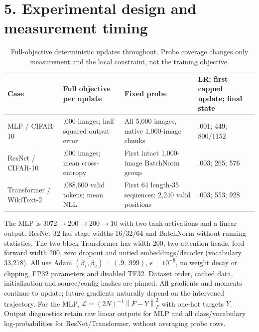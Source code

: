 \documentclass[11pt,a4paper]{article}
\newcommand{\norm}[1]{\left\lVert#1\right\rVert}
\newcommand{\sect}[1]{\vspace{2pt}\section*{#1}\vspace{-4pt}}
\begin{document}
\newpage
\sect{5. Experimental design and measurement timing}
\begin{table}[H]
\centering\small\setlength{\tabcolsep}{4pt}
\begin{tabular}{@{}>{\raggedright\arraybackslash}p{.17\linewidth}>{\raggedright\arraybackslash}p{.27\linewidth}>{\raggedright\arraybackslash}p{.29\linewidth}>{\raggedright\arraybackslash}p{.20\linewidth}@{}}
\toprule
Case & Full objective per update & Fixed probe & LR; first capped update; final state \\
\midrule
MLP / CIFAR-10 & 5,000 images; half squared output error & All 5,000 images, native 1,000-image chunks & .001; 449; 800/1152 \\
ResNet / CIFAR-10 & 50,000 images; mean cross-entropy & First intact 1,000-image BatchNorm group & .003; 265; 576 \\
Transformer / WikiText-2 & 2,088,600 valid tokens; mean NLL & First 64 length-35 sequences: 2,240 valid positions & .003; 553; 928 \\
\bottomrule
\end{tabular}
\caption{Full-objective deterministic updates throughout. Probe coverage changes only
measurement and the local constraint, not the training objective.}
\end{table}

The MLP is $3072\to200\to200\to10$ with two tanh activations and a linear output.
ResNet-32 has stage widths 16/32/64 and BatchNorm without running statistics.
The two-block Transformer has width 200, two attention heads, feed-forward width
200, zero dropout and untied embeddings/decoder (vocabulary 33,278).
All use Adam $(\beta_1,\beta_2)=(.9,.999)$, $\epsilon=10^{-8}$, no weight decay
or clipping, FP32 parameters and disabled TF32. Dataset order, cached data,
initialization and source/config hashes are pinned. All gradients and moments
continue to update; future gradients naturally depend on the intervened trajectory.
For the MLP, $\mathcal L=(2N)^{-1}\norm{F-Y}_F^2$ with one-hot targets $Y$.
Output diagnostics retain raw linear outputs for MLP and all class/vocabulary
log-probabilities for ResNet/Transformer, without averaging probe rows.
\end{document}
